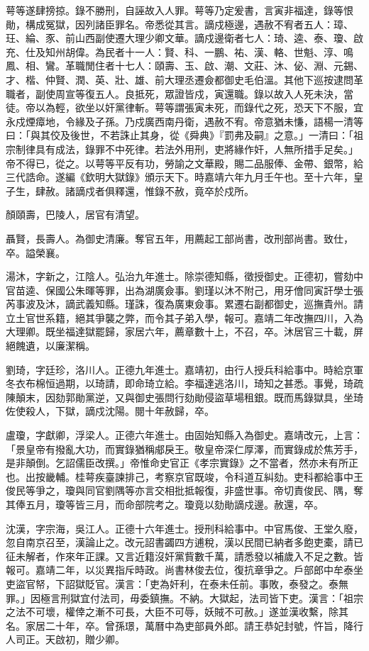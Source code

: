 \begin{pinyinscope}
萼等遂肆搒掠。錄不勝刑，自誣故入人罪。萼等乃定爰書，言寅非福達，錄等恨勛，構成冤獄，因列諸臣罪名。帝悉從其言。謫戍極邊，遇赦不宥者五人：璋、玨、綸、豕、前山西副使遷大理少卿文華。謫戍邊衛者七人：琦、逵、泰、瓊、啟充、仕及知州胡偉。為民者十一人：賢、科、一鵬、祐、漢、輅、世魁、淳、鳴鳳、相、鸞。革職閒住者十七人：頤壽、玉、啟、潮、文莊、沐、佖、淵、元錫、才、楷、仲賢、潤、英、壯、雄、前大理丞遷僉都御史毛伯溫。其他下巡按逮問革職者，副使周宣等復五人。良抵死，眾證皆戍，寅還職。錄以故入人死未決，當徒。帝以為輕，欲坐以奸黨律斬。萼等謂張寅未死，而錄代之死，恐天下不服，宜永戍煙瘴地，令緣及子孫。乃戍廣西南丹衛，遇赦不宥。帝意猶未慊，語楊一清等曰：「與其佼及後世，不若誅止其身，從《舜典》『罰弗及嗣』之意。」一清曰：「祖宗制律具有成法，錄罪不中死律。若法外用刑，吏將緣作奸，人無所措手足矣。」帝不得已，從之。以萼等平反有功，勞諭之文華殿，賜二品服俸、金帶、銀幣，給三代誥命。遂編《欽明大獄錄》頒示天下。時嘉靖六年九月壬午也。至十六年，皇子生，肆赦。諸謫戍者俱釋還，惟錄不赦，竟卒於戍所。

顏頤壽，巴陵人，居官有清望。

聶賢，長壽人。為御史清廉。奪官五年，用薦起工部尚書，改刑部尚書。致仕，卒。謚榮襄。

湯沐，字新之，江陰人。弘治九年進士。除崇德知縣，徵授御史。正德初，嘗劾中官苗逵、保國公朱暉等罪，出為湖廣僉事。劉瑾以沐不附己，用牙儈同寅訐學士張芮事波及沐，謫武義知縣。瑾誅，復為廣東僉事。累遷右副都御史，巡撫貴州。請立土官世系籍，絕其爭襲之弊，而令其子弟入學，報可。嘉靖二年改撫四川，入為大理卿。既坐福達獄罷歸，家居六年，薦章數十上，不召，卒。沐居官三十載，屏絕餽遺，以廉潔稱。

劉琦，字廷珍，洛川人。正德九年進士。嘉靖初，由行人授兵科給事中。時給京軍冬衣布棉恒過期，以琦請，即命琦立給。李福達逃洛川，琦知之甚悉。事覺，琦疏陳顛末，因劾郭勛黨逆，又與御史張問行劾勛侵盜草場租銀。既而馬錄獄具，坐琦佐使殺人，下獄，謫戍沈陽。閱十年赦歸，卒。

盧瓊，字獻卿，浮梁人。正德六年進士。由固始知縣入為御史。嘉靖改元，上言：「景皇帝有撥亂大功，而實錄猶稱郕戾王。敬皇帝深仁厚澤，而實錄成於焦芳手，是非顛倒。乞詔儒臣改撰。」帝惟命史官正《孝宗實錄》之不當者，然亦未有所正也。出按畿輔。桂萼疾臺諫排己，考察京官既竣，令科道互糾劾。吏科都給事中王俊民等爭之，瓊與同官劉隅等亦言交相批抵報復，非盛世事。帝切責俊民、隅，奪其俸五月，瓊等皆三月，而命部院考之。瓊竟以劾勛謫戍邊。赦還，卒。

沈漢，字宗海，吳江人。正德十六年進士。授刑科給事中。中官馬俊、王堂久廢，忽自南京召至，漢論止之。改元詔書蠲四方逋稅，漢以民間已納者多飽吏橐，請已征未解者，作來年正課。又言近籍沒奸黨貲數千萬，請悉發以補歲入不足之數。皆報可。嘉靖二年，以災異指斥時政。尚書林俊去位，復抗章爭之。戶部郎中牟泰坐吏盜官帑，下詔獄貶官。漢言：「吏為奸利，在泰未任前。事敗，泰發之。泰無罪。」因極言刑獄宜付法司，毋委鎮撫。不納。大獄起，法司皆下吏。漢言：「祖宗之法不可壞，權倖之漸不可長，大臣不可辱，妖賊不可赦。」遂並漢收繫，除其名。家居二十年，卒。曾孫璟，萬曆中為吏部員外郎。請王恭妃封號，忤旨，降行人司正。天啟初，贈少卿。


\end{pinyinscope}
